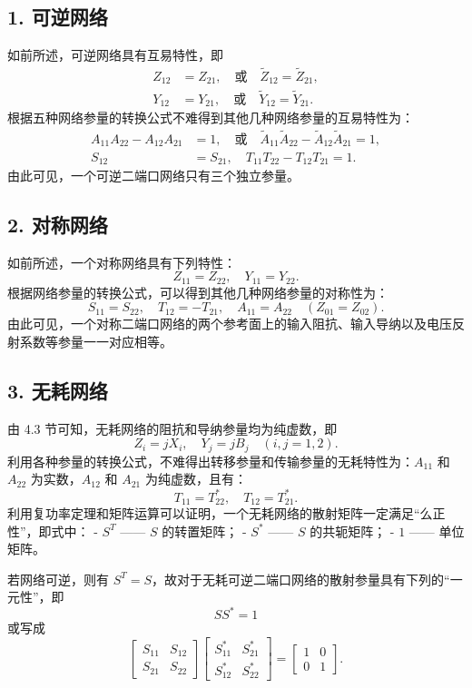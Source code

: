 \subsection*{1. 可逆网络}
如前所述，可逆网络具有互易特性，即
\[
\begin{aligned}
	Z_{12} &= Z_{21}, \quad \text{或} \quad \widetilde{Z}_{12} = \widetilde{Z}_{21}, \\
	Y_{12} &= Y_{21}, \quad \text{或} \quad \widetilde{Y}_{12} = \widetilde{Y}_{21}.
\end{aligned}
\]
根据五种网络参量的转换公式不难得到其他几种网络参量的互易特性为：
\[
\begin{aligned}
	A_{11} A_{22} - A_{12} A_{21} &= 1, \quad \text{或} \quad \widetilde{A}_{11} \widetilde{A}_{22} - \widetilde{A}_{12} \widetilde{A}_{21} = 1, \\
	S_{12} &= S_{21}, \quad T_{11} T_{22} - T_{12} T_{21} = 1.
\end{aligned}
\]
由此可见，一个可逆二端口网络只有三个独立参量。

\subsection*{2. 对称网络}
如前所述，一个对称网络具有下列特性：
\[
Z_{11} = Z_{22}, \quad Y_{11} = Y_{22}.
\]
根据网络参量的转换公式，可以得到其他几种网络参量的对称性为：
\[
S_{11} = S_{22}, \quad T_{12} = -T_{21}, \quad A_{11} = A_{22} \quad (Z_{01} = Z_{02}).
\]
由此可见，一个对称二端口网络的两个参考面上的输入阻抗、输入导纳以及电压反射系数等参量一一对应相等。

\subsection*{3. 无耗网络}
由 4.3 节可知，无耗网络的阻抗和导纳参量均为纯虚数，即
\[
Z_i = j X_i, \quad Y_j = j B_j \quad (i, j = 1, 2).
\]
利用各种参量的转换公式，不难得出转移参量和传输参量的无耗特性为：\( A_{11} \) 和 \( A_{22} \) 为实数，\( A_{12} \) 和 \( A_{21} \) 为纯虚数，且有：
\[
T_{11} = T_{22}^*, \quad T_{12} = T_{21}^*.
\]
利用复功率定理和矩阵运算可以证明，一个无耗网络的散射矩阵一定满足“么正性”，即式中：
- $ S^T $ —— $ S $ 的转置矩阵；
- $ S^* $ —— $ S $ 的共轭矩阵；
- $ 1 $ —— 单位矩阵。

若网络可逆，则有 $ S^T = S $，故对于无耗可逆二端口网络的散射参量具有下列的“一元性”，即
\[
S S^* = 1
\]
或写成
\[
\begin{bmatrix}
	S_{11} & S_{12} \\
	S_{21} & S_{22}
\end{bmatrix}
\begin{bmatrix}
	S_{11}^* & S_{21}^* \\
	S_{12}^* & S_{22}^*
\end{bmatrix}
=
\begin{bmatrix}
	1 & 0 \\
	0 & 1
\end{bmatrix}.
\]

